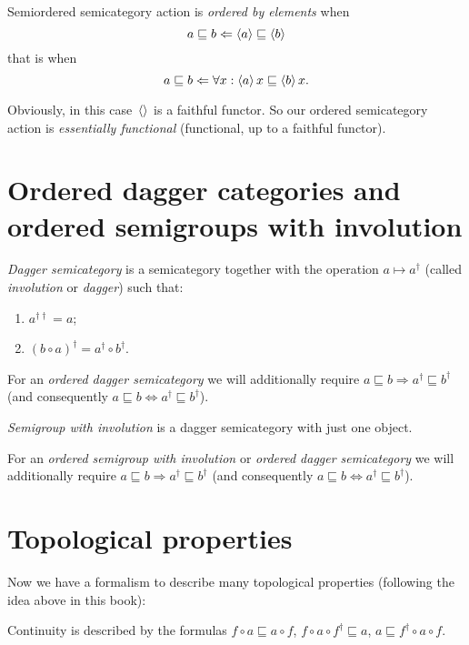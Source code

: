 Semiordered semicategory action is \emph{ordered by elements} when \[ a\sqsubseteq b \Leftarrow \left\langle a\right\rangle\sqsubseteq \left\langle b\right\rangle \] that is when \[ a\sqsubseteq b \Leftarrow \forall x:\left\langle a\right\rangle x\sqsubseteq\left\langle b\right\rangle x. \]

Obviously, in this case~$\left\langle \right\rangle$ is a faithful functor. So our ordered semicategory action is \emph{essentially functional} (functional, up to a faithful functor).

\chapter{Ordered dagger categories and ordered semigroups with involution}

\begin{defn}
\emph{Dagger semicategory} is a semicategory together with the operation $a\mapsto a^{\dagger}$ (called \emph{involution} or \emph{dagger}) such that:
\begin{enumerate}
\item $a^{\dagger\dagger} = a$;
\item $(b\circ a)^{\dagger} = a^{\dagger}\circ b^{\dagger}$.
\end{enumerate}
\end{defn}

For an \emph{ordered dagger semicategory} we will additionally require $a\sqsubseteq b\Rightarrow a^{\dagger}\sqsubseteq b^{\dagger}$ (and consequently $a\sqsubseteq b\Leftrightarrow a^{\dagger}\sqsubseteq b^{\dagger}$).

\begin{defn}
\emph{Semigroup with involution} is a dagger semicategory with just one object.
\end{defn}

For an \emph{ordered semigroup with involution} or \emph{ordered dagger semicategory} we will additionally require $a\sqsubseteq b\Rightarrow a^{\dagger}\sqsubseteq b^{\dagger}$ (and consequently $a\sqsubseteq b\Leftrightarrow a^{\dagger}\sqsubseteq b^{\dagger}$).

\chapter{Topological properties}

Now we have a formalism to describe many topological properties (following the idea above in this book):

Continuity is described by the formulas $f\circ a\sqsubseteq a\circ f$, $f\circ a\circ f^{\dagger}\sqsubseteq a$, $a\sqsubseteq f^{\dagger}\circ a\circ f$.

